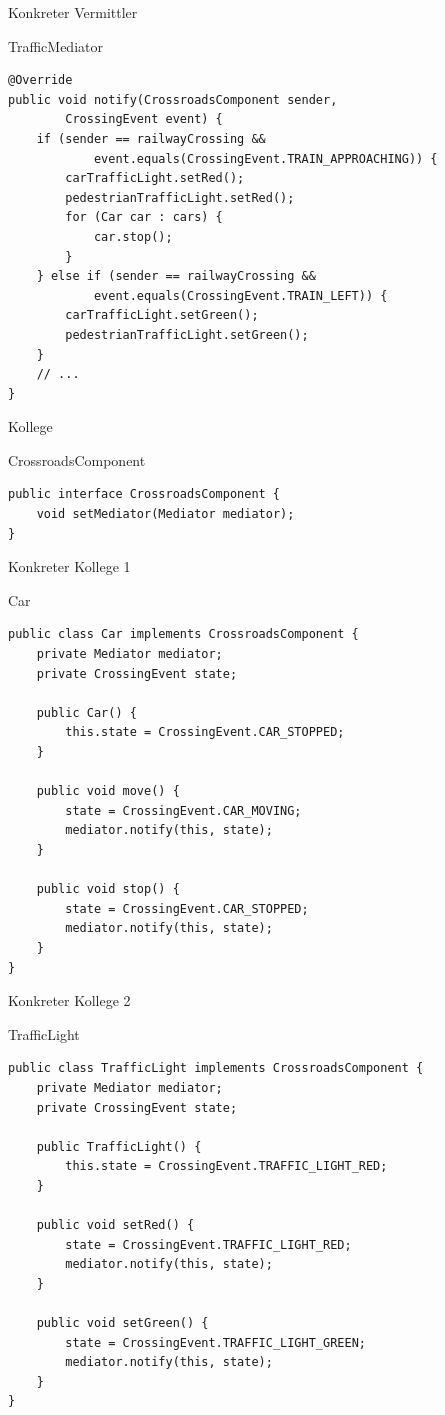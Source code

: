 \begin{frame}[fragile]{Konkreter Vermittler}
	\begin{exampleblock}{TrafficMediator}
 		\begin{lstlisting}
@Override
public void notify(CrossroadsComponent sender, 
        CrossingEvent event) {
    if (sender == railwayCrossing &&
            event.equals(CrossingEvent.TRAIN_APPROACHING)) {
        carTrafficLight.setRed();
        pedestrianTrafficLight.setRed();
        for (Car car : cars) {
            car.stop();
        }
    } else if (sender == railwayCrossing && 
            event.equals(CrossingEvent.TRAIN_LEFT)) {
        carTrafficLight.setGreen();
        pedestrianTrafficLight.setGreen();
    } 
    // ...
}
        \end{lstlisting}
 	\end{exampleblock}
\end{frame}

\begin{frame}[fragile]{Kollege}
	\begin{exampleblock}{CrossroadsComponent}
 		\begin{lstlisting}
public interface CrossroadsComponent {
	void setMediator(Mediator mediator);
}
        \end{lstlisting}
 	\end{exampleblock}
\end{frame}

\begin{frame}[fragile]{Konkreter Kollege 1}
	\begin{exampleblock}{Car}
 		\begin{lstlisting}
public class Car implements CrossroadsComponent {
	private Mediator mediator;
	private CrossingEvent state;

	public Car() {
		this.state = CrossingEvent.CAR_STOPPED;
	}

	public void move() {
		state = CrossingEvent.CAR_MOVING;
		mediator.notify(this, state);
	}

	public void stop() {
		state = CrossingEvent.CAR_STOPPED;
		mediator.notify(this, state);
	}
}
        \end{lstlisting}
 	\end{exampleblock}
\end{frame}

\begin{frame}[fragile]{Konkreter Kollege 2}
	\begin{exampleblock}{TrafficLight}
 		\begin{lstlisting}
public class TrafficLight implements CrossroadsComponent {
	private Mediator mediator;
	private CrossingEvent state;

	public TrafficLight() {
		this.state = CrossingEvent.TRAFFIC_LIGHT_RED;
	}

	public void setRed() {
		state = CrossingEvent.TRAFFIC_LIGHT_RED;
		mediator.notify(this, state);
	}

	public void setGreen() {
		state = CrossingEvent.TRAFFIC_LIGHT_GREEN;
		mediator.notify(this, state);
	}
}
        \end{lstlisting}
 	\end{exampleblock}
\end{frame}
